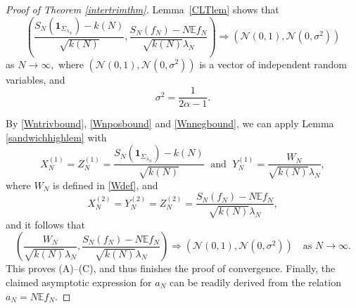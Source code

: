 \documentclass[11pt,twoside,a4paper,reqno]{amsart}
\newcommand{\as}[1]{\text{as } #1 \rightarrow\infty}
\newcommand{\E}{\mathbb{E}}
\def\one{{\mathbf{1}}}
\begin{document}
\begin{proof}[Proof of Theorem \ref{intertrimthm}]
Lemma~\ref{CLTlem} shows that
\begin{equation*}
\left( \frac{S_N(\one_{\Sigma_{\lambda_N}}) - k(N)}{\sqrt{k(N)}}, \frac{S_N(f_N) - N \E f_N}{\sqrt{k(N)} \lambda_N} \right) \Rightarrow (\mathcal{N}(0,1), \mathcal{N}(0,\sigma^2))
\end{equation*}
as $N\to\infty,$ where $(\mathcal{N}(0,1), \mathcal{N}(0,\sigma^2))$ is a vector of independent random variables, and
\begin{equation*}
\sigma^2=\frac{1}{2\alpha-1}.
\end{equation*}

By \eqref{Wntrivbound}, \eqref{Wnposbound} and \eqref{Wnnegbound}, we can apply Lemma \ref{sandwichhighlem} with
\begin{equation*}
X_N^{(1)}=Z_N^{(1)}=\frac{S_N(\one_{\Sigma_{\lambda_N}}) - k(N)}{\sqrt{k(N)}} \; \text{ and } \; Y_N^{(1)}=\frac{W_N}{\sqrt{k(N)} \lambda_N},
\end{equation*}
where $W_N$ is defined in \eqref{Wdef}, and
\begin{equation*}
X_N^{(2)}=Y_N^{(2)}=Z_N^{(2)}=\frac{S_N(f_N) - N \E f_N}{\sqrt{k(N)} \lambda_N},
\end{equation*}
and it follows that
\begin{equation*}
\left( \frac{W_N}{\sqrt{k(N)} \lambda_N}, \frac{S_N(f_N) - N \E f_N}{\sqrt{k(N)} \lambda_N} \right) \Rightarrow (\mathcal{N}(0,1), \mathcal{N}(0,\sigma^2)) \quad \as{N}.
\end{equation*}
This proves (A)--(C), and thus finishes the proof of convergence.
Finally, the claimed asymptotic expression for $a_N$ can be readily derived from the relation $a_N=N\mathbb{E}f_N$.
\end{proof}
\end{document}
